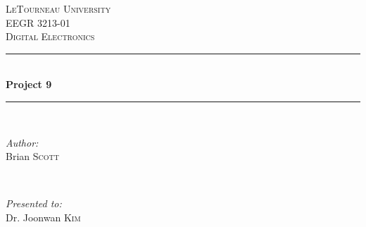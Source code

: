 \begin{titlepage}
\newcommand{\HRule}{\rule{\linewidth}{0.4mm}} %

\center %


\textsc{\LARGE LeTourneau University}\\[1.5cm] %
\textsc{\Large EEGR 3213-01}\\[0.5cm] %
\textsc{\large Digital Electronics}\\[0.5cm] %


\HRule \\[0.4cm]
{\huge \bfseries Project 9}\\[2mm] %
\HRule \\[3cm]

\begin{minipage}{0.35\textwidth}
	\begin{flushleft} \Large
		\emph{Author:}\\
		Brian \textsc{Scott} %
	\end{flushleft}
\end{minipage}
~
\begin{minipage}{0.35\textwidth}
	\begin{flushright} \Large
		\emph{Presented to:} \\
		Dr. Joonwan \textsc{Kim} %
	\end{flushright}
\end{minipage}\\[4cm]



\end{titlepage}
